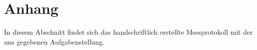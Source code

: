 
\newpage
\section{Anhang}
In diesem Abschnitt findet sich das handschriftlich erstellte Messprotokoll mit der uns gegebenen Aufgabenstellung.\\
\begin{figure}[htbp]

\end{figure}
